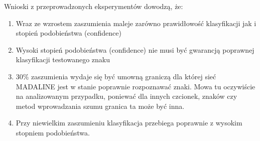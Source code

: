 \documentclass[12pt]{article}
\begin{document}
Wnioski z przeprowadzonych eksperymentów dowodzą, że:

\begin{enumerate}
  \item Wraz ze wzrostem zaszumienia maleje zarówno prawidłowość klasyfikacji jak i stopień podobieństwa (confidence)
  \item Wysoki stopień podobieństwa (confidence) nie musi być gwarancją poprawnej klasyfikacji testowanego znaku
  \item 30\% zaszumienia wydaje się być umowną graniczą dla której sieć MADALINE jest w stanie poprawnie rozpoznawać znaki. Mowa tu oczywiście na analizowanym przypadku, poniewać dla innych czcionek, znaków czy metod wprowadzania szumu granica ta może być inna.
  \item Przy niewielkim zaszumieniu klasyfikacja przebiega poprawnie z wysokim stopniem podobieństwa.

\end{enumerate}

\renewcommand\refname{Bibliografia}


\end{document}
